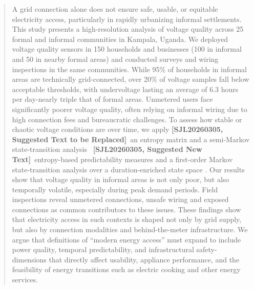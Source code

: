 \documentclass[review]{elsarticle}
\DeclareRobustCommand{\suggestreplacesjl}[2]{%
  {\color{sjlmutedred}\textbf{[SJL20260305, Suggested Text to be Replaced]}\ #1}%
  \ {\color{sjlmutedblue}\textbf{[SJL20260305, Suggested New Text]}\ #2}%
}
\begin{document}
\begin{frontmatter}



\begin{abstract}
A grid connection alone does not ensure safe, usable, or equitable electricity access, particularly in rapidly urbanizing informal settlements. This study presents a high-resolution analysis of voltage quality across 25 formal and informal communities in Kampala, Uganda. We deployed voltage quality sensors in 150 households and businesses (100 in informal and 50 in nearby formal areas) and conducted surveys and wiring inspections in the same communities. While 95\% of households in informal areas are technically grid-connected, over 20\% of voltage samples fall below acceptable thresholds, with undervoltage lasting an average of 6.3 hours per day-nearly triple that of formal areas. Unmetered users face significantly poorer voltage quality, often relying on informal wiring due to high connection fees and bureaucratic challenges. To assess how stable or chaotic voltage conditions are over time, we apply \suggestreplacesjl{an entropy matrix and a semi-Markov state-transition analysis}{entropy-based predictability measures and a first-order Markov state-transition analysis over a duration-enriched state space}. Our results show that voltage quality in informal areas is not only poor, but also temporally volatile, especially during peak demand periods. Field inspections reveal unmetered connections, unsafe wiring and exposed connections as common contributors to these issues. These findings show that electricity access in such contexts is shaped not only by grid supply, but also by connection modalities and behind-the-meter infrastructure. We argue that definitions of “modern energy access” must expand to include power quality, temporal predictability, and infrastructural safety-dimensions that directly affect usability, appliance performance, and the feasibility of energy transitions such as electric cooking and other energy services.

\end{abstract}


\end{frontmatter}
\end{document}
